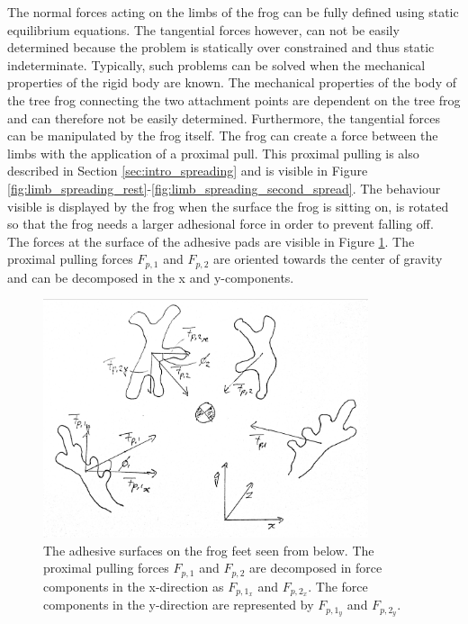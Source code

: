 \qquad The normal forces acting on the limbs of the frog can be fully defined using static equilibrium equations. The tangential forces however, can not be easily determined because the problem is statically over constrained and thus static indeterminate. Typically, such problems can be solved when the mechanical properties of the rigid body are known. The mechanical properties of the body of the tree frog connecting the two attachment points are dependent on the tree frog and can therefore not be easily determined. Furthermore, the tangential forces can be manipulated by the frog itself. The frog can create a force between the limbs with the application of a proximal pull. This proximal pulling is also described in Section \ref{sec:intro_spreading} and is visible in Figure \ref{fig:limb_spreading_rest}-\ref{fig:limb_spreading_second_spread}. The behaviour visible is displayed by the frog when the surface the frog is sitting on, is rotated so that the frog needs a larger adhesional force in order to prevent falling off.\\ 

\qquad The forces at the surface of the adhesive pads are visible in Figure \ref{fig:frog_feet}. The proximal pulling forces $F_{p,1}$ and $F_{p,2}$ are oriented towards the center of gravity and can be decomposed in the x and y-components. 

\begin{figure}[h!]
    \includegraphics[width=0.65\linewidth, height=7cm, angle=0]{images/limb spreading/frog_feet_streched.jpg}
    \caption{The adhesive surfaces on the frog feet seen from below. The proximal pulling forces $F_{p,1}$ and $F_{p,2}$ are decomposed in force components in the x-direction as $F_{p,1_x}$ and $F_{p,2_x}$. The force components in the y-direction are represented by $F_{p,1_y}$ and $F_{p,2_y}$.}
    \label{fig:frog_feet}
\end{figure}

